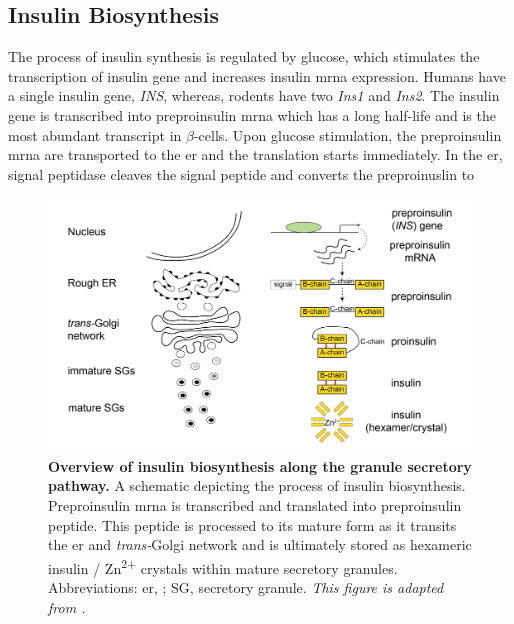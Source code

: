 


\subsection{Insulin Biosynthesis} %
\label{sec:insbio}


The process of insulin synthesis is regulated by glucose, which stimulates the transcription of insulin gene and increases insulin \gls{mrna} expression. Humans have a single insulin gene, \textit{INS}, whereas, rodents have two \textit{Ins1} and \textit{Ins2}. The insulin gene is transcribed into preproinsulin \gls{mrna} which has a long half-life and is the most abundant transcript in $\beta$-cells. Upon glucose stimulation, the preproinsulin \gls{mrna} are transported to the \gls{er} and the translation starts immediately. In the \gls{er}, signal peptidase cleaves the signal peptide and converts the preproinuslin to

\begin{figure}[H]
    \centering
    \includegraphics[width=\linewidth]{Chapter1/Fig/F1-9-01.png}
    \caption[Insulin biosynthesis in $\beta$-cells]{\textbf{Overview of insulin biosynthesis along the granule secretory pathway.} A schematic depicting the process of insulin biosynthesis. Preproinsulin \gls{mrna} is transcribed and translated into preproinsulin peptide. This peptide is processed to its mature form as it transits the \gls{er} and \textit{trans-}Golgi network and is ultimately stored as hexameric insulin / Zn\textsuperscript{2+} crystals within mature secretory granules. Abbreviations: \gls{er}, ; SG, secretory granule. \textit{This figure is adapted from \textbf{\cite{tokarz_cell_2018}}.}}
    \label{fig:chp1_ins_bio}
\end{figure}

